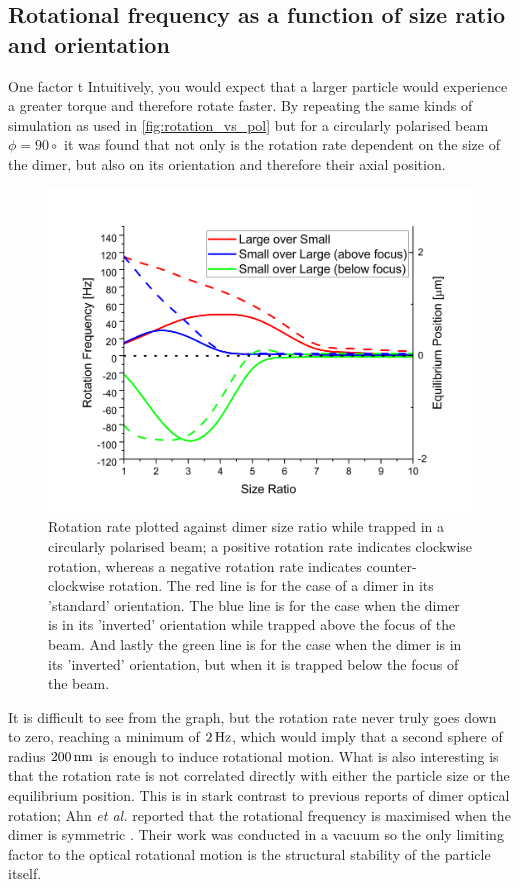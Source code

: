\subsection{Rotational frequency as a function of size ratio and 
	orientation}
\label{sec:rot_size}	
One factor t Intuitively, you would expect that a 
larger particle would experience a greater torque and therefore 
rotate faster. By repeating the same kinds of simulation as used 
in \ref{fig:rotation_vs_pol} but for a circularly polarised beam 
$\phi=90\circ$ it was found that not only is the rotation rate 
dependent on the size of the dimer, but also on its orientation 
and therefore their axial position.
\begin{figure}[h!]
  \centering
  \includegraphics[width=\linewidth]{rotation_rate_vs_size.png}
  \caption{Rotation rate plotted against dimer size ratio while 
  	trapped in a circularly polarised beam; a positive rotation 
  	rate indicates clockwise rotation, whereas a negative 
  	rotation rate indicates counter-clockwise rotation. The red 
  	line is for the case of a dimer in its 'standard' orientation. 
  	The blue line is for the case when the dimer is in its 
  	'inverted' orientation while trapped above the focus of the 
  	beam. And lastly the green line is for the case when the 
  	dimer is in its 'inverted' orientation, but when it is trapped 
  	below the focus of the beam.}
\end{figure}

It is difficult to see from the graph, but the rotation rate never
truly goes down to zero, reaching a minimum of $2\,{\rm Hz}$, which 
would imply that a second sphere of radius $200\,{\rm nm}$ is enough 
to induce rotational motion. What is also interesting is that the 
rotation rate is not correlated directly with either the particle 
size or the equilibrium position. This is in stark contrast to previous
reports of dimer optical rotation; Ahn \textit{et al.} reported that
the rotational frequency is maximised when the dimer is symmetric 
\cite{Ahn2018}. Their work was conducted in a vacuum so the only 
limiting factor to the optical rotational motion is the structural 
stability of the particle itself. 

